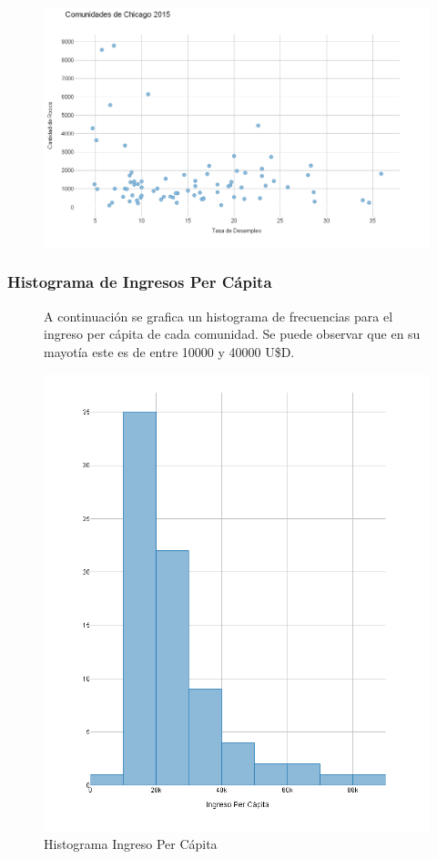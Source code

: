 \documentclass[9pt]{article}
\begin{document}
\begin{figure}[H]
    \centering

    \includegraphics[width=\textwidth]{Graficos Chicago/Desempleo vs Robos.png}
\end{figure}
\subsubsection{Histograma de Ingresos Per C\'apita}

\begin{figure}[H]
A continuaci\'on se grafica un histograma de frecuencias para el ingreso per c\'apita de cada comunidad. Se puede observar que en su mayot\'ia este es de entre 10000 y 40000 U\$D.
    \centering
\caption*{Histograma Ingreso Per C\'apita}
 
    \includegraphics[width=\textwidth]{Graficos Chicago/Ingreso Per Capita.png}
\end{figure}
\newpage
\end{document}
